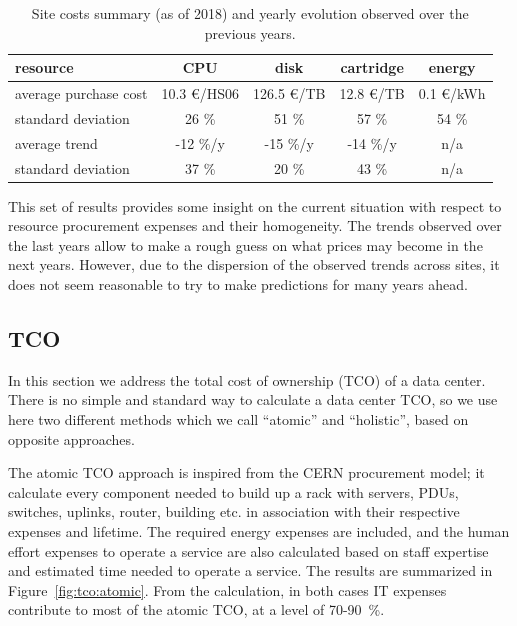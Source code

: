 \begin{table}[h]
    \centering
    \caption{Site costs summary (as of 2018) and yearly evolution observed over the previous years.}
    \label{tab:sitecosts}
    \begin{tabular}{l|cccc}
        \hline
        resource & CPU & disk & cartridge & energy \\\hline
        average purchase cost & 10.3 \euro/HS06 & 126.5 \euro/TB & 12.8 \euro/TB & 0.1 \euro/kWh\\\hline
        standard deviation & 26 \% & 51 \% & 57 \% & 54 \% \\\hline
        average trend & -12 \%/y & -15 \%/y & -14 \%/y & n/a \\\hline
        standard deviation & 37 \% & 20 \% & 43 \% & n/a \\\hline
    \end{tabular}
\end{table}


This set of results provides some insight on the current situation
with respect to resource procurement expenses and their
homogeneity. The trends observed over the last years allow to make a
rough guess on what prices may become in the next years. However, due
to the dispersion of the observed trends across sites, it does not seem
reasonable to try to make predictions for many years ahead.

\subsection{\label{sec:sitecost:tco}TCO}

In this section we address the total cost of ownership (TCO) of a data center.
There is no simple and standard way to calculate a data center TCO, so we use here two different methods which we call
``atomic'' and ``holistic'', based on opposite approaches.

The atomic TCO approach is inspired from the CERN procurement model; it calculate every component needed to build up
a rack with servers, PDUs, switches, uplinks, router, building etc. in association with their respective expenses and lifetime.
The required energy expenses are included, and the human effort expenses to operate a service are also calculated
based on staff expertise and estimated time needed to operate a service.
The results are summarized in Figure~\ref{fig:tco:atomic}.
From the calculation, in both cases IT expenses contribute to most of the atomic TCO, at a level of 70-90~\%.


